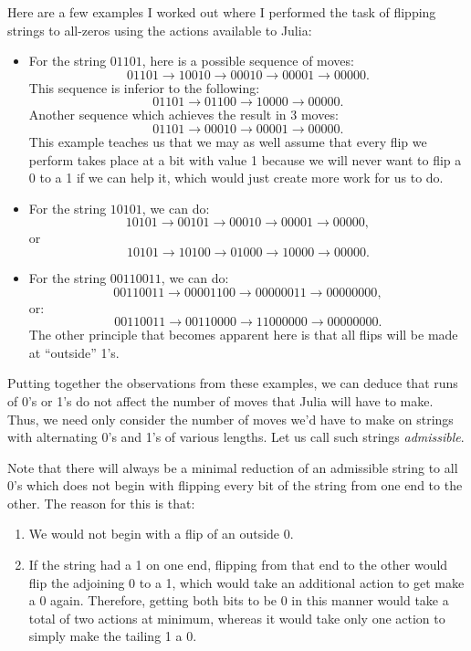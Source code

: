 \documentclass{article}
\begin{document}
Here are a few examples I worked out where I performed the task of flipping strings to all-zeros using the actions available to Julia:
\begin{itemize}
\item{
  For the string $01101$, here is a possible sequence of moves:
  \[01101 \rightarrow 10010 \rightarrow 00010 \rightarrow 00001 \rightarrow 00000.\]
  This sequence is inferior to the following:
  \[01101 \rightarrow 01100 \rightarrow 10000 \rightarrow 00000.\]
  Another sequence which achieves the result in 3 moves:
  \[01101 \rightarrow 00010 \rightarrow 00001 \rightarrow 00000.\]
  This example teaches us that we may as well assume that every flip we perform takes place at a bit with value 1 because we will never want to flip a 0 to a 1 if we can help it, which would just create more work for us to do.
}
\item{
  For the string $10101$, we can do:
  \[10101 \rightarrow 00101 \rightarrow 00010 \rightarrow 00001 \rightarrow 00000,\]
  or
  \[10101 \rightarrow 10100 \rightarrow 01000 \rightarrow 10000 \rightarrow 00000.\]
}
\item{
  For the string $00110011$, we can do:
  \[00110011 \rightarrow 00001100 \rightarrow 00000011 \rightarrow 00000000,\]
  or:
  \[00110011 \rightarrow 00110000 \rightarrow 11000000 \rightarrow 00000000.\]
  The other principle that becomes apparent here is that all flips will be made at ``outside'' 1's.
}
\end{itemize}

Putting together the observations from these examples, we can deduce that runs of 0's or 1's do not affect the number of moves that Julia will have to make. Thus, we need only consider the number of moves we'd have to make on strings with alternating 0's and 1's of various lengths. Let us call such strings \emph{admissible}.

Note that there will always be a minimal reduction of an admissible string to all 0's which does not begin with flipping every bit of the string from one end to the other. The reason for this is that:
\begin{enumerate}
\item{ We would not begin with a flip of an outside 0.}
\item{ If the string had a 1 on one end, flipping from that end to the other would flip the adjoining 0 to a 1, which would take an additional action to get make a 0 again. Therefore, getting both bits to be 0 in this manner would take a total of two actions at minimum, whereas it would take only one action to simply make the tailing 1 a 0.}
\end{enumerate}
\end{document}
